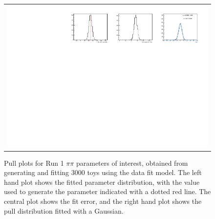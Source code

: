 \begin{figure}
\begin{tabular}{c}
\includegraphics[width=\textwidth]{ANA_resources/Plots/Data_fit/FitterBias//N_Bs_pipi_run1.pdf} \\
  \end{tabular}
  \caption{Pull plots for Run 1 $\pi\pi$ parameters of interest, obtained from generating and fitting 3000 toys using the data fit model. The left hand plot shows the fitted parameter distribution, with the value used to generate the parameter indicated with a dotted red line. The central plot shows the fit error, and the right hand plot shows the pull distribution fitted with a Gaussian.}
\label{fig:pipi_run1_pulls}
\end{figure}
